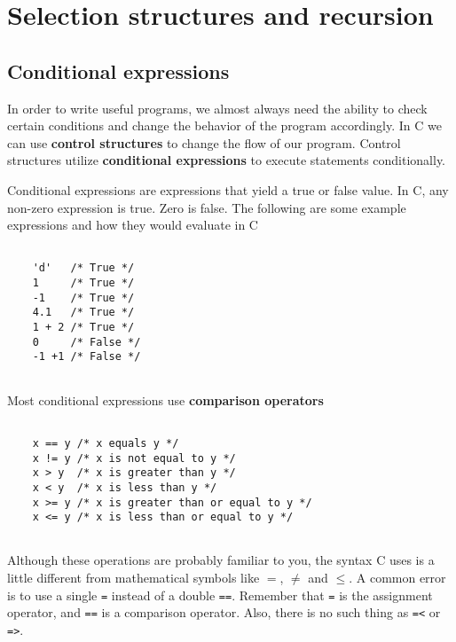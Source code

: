 
\chapter{Selection structures and recursion}

\label{condrecursion}


\section{Conditional expressions}

In order to write useful programs, we almost always need the ability
to check certain conditions and change the behavior of the program
accordingly.  In C we can use {\bf control structures} to change the flow of our program.
Control structures utilize {\bf conditional expressions} to execute statements conditionally.


Conditional expressions are expressions that yield a true or false value. 
In C, any non-zero expression is true. Zero is false. The following are some example expressions and how they would evaluate in C

\begin{verbatim}

    'd'   /* True */
    1     /* True */
    -1    /* True */
    4.1   /* True */
    1 + 2 /* True */
    0     /* False */
    -1 +1 /* False */
	
\end{verbatim}
%

Most conditional expressions use {\bf comparison operators} 

\begin{verbatim}

	x == y /* x equals y */
	x != y /* x is not equal to y */
	x > y  /* x is greater than y */
	x < y  /* x is less than y */
	x >= y /* x is greater than or equal to y */
	x <= y /* x is less than or equal to y */
	
\end{verbatim}
%
Although these operations are probably familiar to you, the
syntax C uses is a little different from mathematical
symbols like $=$, $\neq$ and $\le$.  A common error is
to use a single {\tt =} instead of a double {\tt ==}.  Remember
that {\tt =} is the assignment operator, and {\tt ==} is
a comparison operator.  Also, there is no such thing as
{\tt =<} or {\tt =>}.

